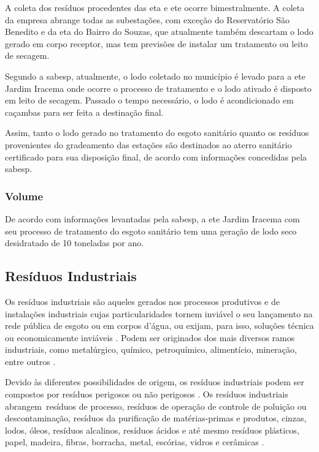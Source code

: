 A coleta dos resíduos procedentes das \gls{eta} e \gls{ete} ocorre bimestralmente. A coleta da empresa abrange todas as subestações, com exceção do Reservatório São Benedito e da \gls{eta} do Bairro do Souzas, que atualmente também descartam o lodo gerado em corpo receptor, mas tem previsões de instalar um tratamento ou leito de secagem.

Segundo a \gls{sabesp}, atualmente, o lodo coletado no município é levado para a \gls{ete} Jardim Iracema onde ocorre o processo de tratamento e o lodo ativado é disposto em leito de secagem. Passado o tempo necessário, o lodo é acondicionado em caçambas para ser feita a destinação final.

Assim, tanto o lodo gerado no tratamento do esgoto sanitário quanto os resíduos provenientes do gradeamento das estações são destinados ao aterro sanitário certificado para sua disposição final, de acordo com informações concedidas pela \gls{sabesp}. 

\subsubsection{Volume}
De acordo com informações levantadas pela \gls{sabesp}, a \gls{ete} Jardim Iracema com seu processo de tratamento do esgoto sanitário tem uma geração de lodo seco desidratado de 10 toneladas por ano.

\subsection{Resíduos Industriais}
\label{sub_ri}

Os resíduos industriais são aqueles gerados nos processos produtivos e de instalações industriais cujas particularidades tornem inviável o seu lançamento na rede pública de esgoto ou em corpos d’água, ou exijam, para isso, soluções técnica ou economicamente inviáveis \cite{brasil:12305, conama:313}. Podem ser originados dos mais diversos ramos industriais, como metalúrgico, químico, petroquímico, alimentício, mineração, entre outros \cite{IPEA2012b}.

Devido às diferentes possibilidades de origem, os resíduos industriais podem ser compostos por resíduos perigosos ou não perigosos \cite{conama:313}. Os resíduos industriais abrangem resíduos de processo, resíduos de operação de controle de poluição ou descontaminação, resíduos da purificação de matérias-primas e produtos, cinzas, lodos, óleos, resíduos alcalinos, resíduos ácidos e até mesmo resíduos plásticos, papel, madeira, fibras, borracha, metal, escórias, vidros e cerâmicas \cite{IPEA2012b}.

